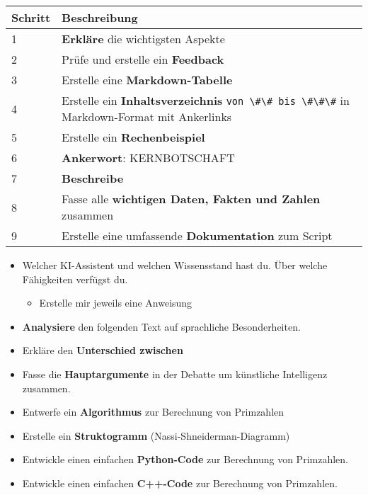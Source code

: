\documentclass{vorlage-design-main}
\begin{document}
\begin{table}[ht]
  \begin{tabular}{@{}ll@{}}
\toprule
Schritt
 &
Beschreibung
 \\
\midrule[\heavyrulewidth]
1 & \textbf{Erkläre} die wichtigsten Aspekte \\
2 & Prüfe und erstelle ein \textbf{Feedback} \\
3 & Erstelle eine \textbf{Markdown-Tabelle} \\
4 & Erstelle ein \textbf{Inhaltsverzeichnis}
\verb|von \#\# bis \#\#\#| in Markdown-Format mit
Ankerlinks \\
5 & Erstelle ein \textbf{Rechenbeispiel} \\
6 & \textbf{Ankerwort}: KERNBOTSCHAFT \\
7 & \textbf{Beschreibe} \\
8 & Fasse alle \textbf{wichtigen Daten, Fakten und Zahlen} zusammen \\
9 & Erstelle eine umfassende \textbf{Dokumentation} zum Script \\
\bottomrule
\end{tabular}%
\end{table}

\begin{itemize}

\item
  Welcher KI-Assistent und welchen Wissensstand hast du. Über welche
  Fähigkeiten verfügst du.

  \begin{itemize}

  \item
    Erstelle mir jeweils eine Anweisung
  \end{itemize}
\item
  \textbf{Analysiere} den folgenden Text auf sprachliche Besonderheiten.
\item
  Erkläre den \textbf{Unterschied zwischen}
\item
  Fasse die \textbf{Hauptargumente} in der Debatte um künstliche
  Intelligenz zusammen.
\item
  Entwerfe ein \textbf{Algorithmus} zur Berechnung von Primzahlen
\item
  Erstelle ein \textbf{Struktogramm} (Nassi-Shneiderman-Diagramm)
\item
  Entwickle einen einfachen \textbf{Python-Code} zur Berechnung von
  Primzahlen.
\item
  Entwickle einen einfachen \textbf{C++-Code} zur Berechnung von
  Primzahlen.
\end{itemize}
\end{document}
